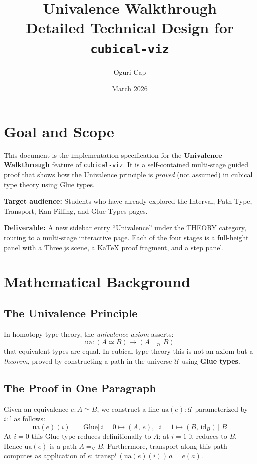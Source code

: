 \documentclass[11pt,a4paper]{article}
\title{\textbf{Univalence Walkthrough}\\
\large Detailed Technical Design for \texttt{cubical-viz}}
\author{Oguri Cap}
\date{March 2026}
\begin{document}
\maketitle
\tableofcontents
\newpage

\section{Goal and Scope}

This document is the implementation specification for the \textbf{Univalence
Walkthrough} feature of \texttt{cubical-viz}. It is a self-contained multi-stage
guided proof that shows how the Univalence principle is \emph{proved} (not
assumed) in cubical type theory using Glue types.

\medskip
\noindent\textbf{Target audience:} Students who have already explored the
Interval, Path Type, Transport, Kan Filling, and Glue Types pages.

\medskip
\noindent\textbf{Deliverable:}  A new sidebar entry ``Univalence'' under the
THEORY category, routing to a multi-stage interactive page.  Each of the four
stages is a full-height panel with a Three.js scene, a KaTeX proof fragment,
and a step panel.

\section{Mathematical Background}

\subsection{The Univalence Principle}

In homotopy type theory, the \emph{univalence axiom} asserts:
\[
  \mathrm{ua} : (A \simeq B) \to (A =_{\mathcal{U}} B)
\]
that equivalent types are equal.  In cubical type theory this is not an axiom
but a \emph{theorem}, proved by constructing a path in the universe $\mathcal{U}$
using \textbf{Glue types}.

\subsection{The Proof in One Paragraph}

Given an equivalence $e : A \simeq B$, we construct a line
$\mathrm{ua}(e) : \mathcal{U}$ parameterized by $i : \mathbb{I}$ as follows:
\[
  \mathrm{ua}(e)(i) \;=\;
  \mathrm{Glue}\bigl[\, i{=}0 \mapsto (A,\, e),\;\; i{=}1 \mapsto (B,\,\mathrm{id}_B) \,\bigr]\; B
\]
At $i=0$ this Glue type reduces definitionally to $A$; at $i=1$ it reduces to
$B$.  Hence $\mathrm{ua}(e)$ is a path $A =_{\mathcal{U}} B$.  Furthermore,
transport along this path computes as application of $e$:
$\mathrm{transp}^i\,(\mathrm{ua}(e)(i))\,a = e(a)$.
\end{document}
